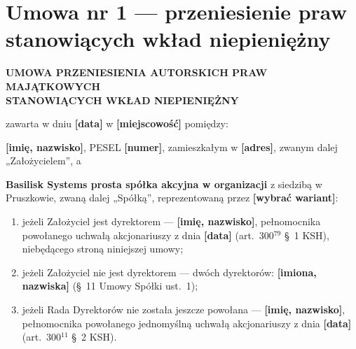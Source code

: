 \documentclass[12pt,a4paper]{report}
\newcounter{paragraf}
\newcommand{\field}[1]{\textbf{[#1]}}
\newcommand{\CompanyFull}{Basilisk Systems prosta spółka akcyjna}
\newcommand{\US}[1]{§~#1 Umowy Spółki}
\begin{document}
\chapter*{Umowa nr 1 --- przeniesienie praw stanowiących wkład niepieniężny}
\setcounter{paragraf}{0}

\begin{center}
{\Large\bfseries UMOWA PRZENIESIENIA AUTORSKICH PRAW MAJĄTKOWYCH\\ STANOWIĄCYCH WKŁAD NIEPIENIĘŻNY}\par
\vspace{0.4cm}
\end{center}

zawarta w dniu \field{data} w \field{miejscowość} pomiędzy:

\textbf{\field{imię, nazwisko}}, PESEL \field{numer}, zamieszkałym w \field{adres}, zwanym dalej „Założycielem”, a

\textbf{\CompanyFull{} w organizacji} z siedzibą w Pruszkowie, zwaną dalej „Spółką”, reprezentowaną przez \field{wybrać wariant}:
\begin{enumerate}[label=\alph*)]
  \item jeżeli Założyciel jest dyrektorem --- \field{imię, nazwisko}, pełnomocnika powołanego uchwałą akcjonariuszy z dnia \field{data} (art.~300$^{79}$ §~1 KSH), niebędącego stroną niniejszej umowy;
  \item jeżeli Założyciel nie jest dyrektorem --- dwóch dyrektorów: \field{imiona, nazwiska} (\US{11} ust.~1);
  \item jeżeli Rada Dyrektorów nie została jeszcze powołana --- \field{imię, nazwisko}, pełnomocnika powołanego jednomyślną uchwałą akcjonariuszy z dnia \field{data} (art.~300$^{11}$ §~2 KSH).
\end{enumerate}
\end{document}
